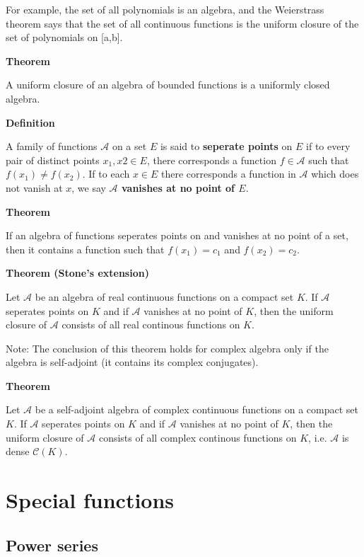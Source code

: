 \documentclass[11pt]{article}
\begin{document}
For example, the set of all polynomials is an algebra, and the Weierstrass theorem says that the set of all continuous functions is the uniform closure of the set of polynomials on [a,b].


\textbf{Theorem}

A uniform closure of an algebra of bounded functions is a uniformly closed algebra.

\textbf{Definition}

A family of functions \(\mathcal{A}\) on a set \(E\) is said to \textbf{seperate points} on \(E\) if to every pair of distinct points \(x_1,x2 \in E\), there corresponds a function \(f \in \mathcal{A}\) such that \(f(x_1) \neq f(x_2)\). If to each \(x \in E\) there corresponds a function in \(\mathcal{A}\) which does not vanish at \(x\), we say \textbf{\(\mathcal{A}\) vanishes at no point of \(E\)}.


\textbf{Theorem}

If an algebra of functions seperates points on and vanishes at no point of a set, then it contains a function such that \(f(x_1) = c_1\) and \(f(x_2) = c_2\).


\textbf{Theorem (Stone's extension)}

Let \(\mathcal{A}\) be an algebra of real continuous functions on a compact set \(K\). If \(\mathcal{A}\) seperates points on \(K\) and if \(\mathcal{A}\) vanishes at no point of \(K\), then the uniform closure of \(\mathcal{A}\) consists of all real continous functions on \(K\).

Note: The conclusion of this theorem holds for complex algebra only if the algebra is self-adjoint (it contains its complex conjugates).

\textbf{Theorem}

Let \(\mathcal{A}\) be a self-adjoint algebra of complex continuous functions on a compact set \(K\). If \(\mathcal{A}\) seperates points on \(K\) and if \(\mathcal{A}\) vanishes at no point of \(K\), then the uniform closure of \(\mathcal{A}\) consists of all complex continous functions on \(K\), i.e. \(\mathcal{A}\) is dense \(\mathcal{C}(K)\).

\section{Special functions}
\label{sec:orgdf31857}

\subsection{Power series}
\label{sec:orgd30f9e9}
\end{document}
